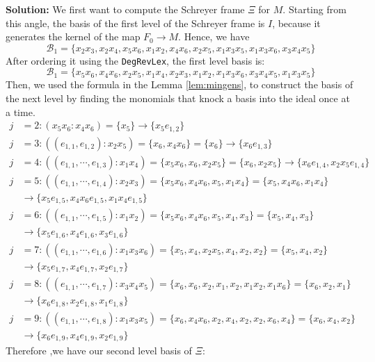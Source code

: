 \documentclass{article}
\theoremstyle{definition}
\theoremstyle{remark}
\theoremstyle{example}
\begin{document}
\textbf{Solution:} We first want to compute the Schreyer frame $\Xi$ for $M$. Starting from this angle, the basis of the first level of the Schreyer frame is $I$, because it generates the kernel of the map $F_0 \rightarrow M$. Hence, we have 
\begin{equation}
    \mathcal{B}_1 = \{x_2x_3,x_2x_4,x_5x_6,x_1x_2,x_4x_6,x_2x_5,x_1x_3x_5,x_1x_3x_6,x_3x_4x_5\}
\end{equation}
After ordering it using the \verb+DegRevLex+, the first level basis is:
\begin{equation}
    \mathcal{B}_1 = \{x_5x_6,x_4x_6,x_2x_5,x_1x_4,x_2x_3,x_1x_2,x_1x_3x_6,x_3x_4x_5,x_1x_3x_5\}
\end{equation}
Then, we used the formula in the Lemma \ref{lem:mingens}, to construct the basis of the next level by finding the monomials that knock a basis into the ideal once at a time.
\begin{align}
    j &= 2: (x_5x_6:x_4x_6) = \{x_5\} \rightarrow \{x_5e_{1,2}\}\\
    j &= 3: ((e_{1,1},e_{1,2}):x_2x_5) = \{x_6,x_4x_6\} = \{x_6\} \rightarrow \{x_6e_{1,3}\}\\
    j &= 4: ((e_{1,1},\cdots,e_{1,3}):x_1x_4) = \{x_5x_6,x_6,x_2x_5\} = \{x_6,x_2x_5\} \rightarrow \{x_6e_{1,4},x_2x_5e_{1,4}\}\\
    j &= 5: ((e_{1,1},\cdots,e_{1,4}):x_2x_3) = \{x_5x_6,x_4x_6,x_5,x_1x_4\} = \{x_5,x_4x_6,x_1x_4\}\\
    &\rightarrow \{x_5e_{1,5},x_4x_6e_{1,5},x_1x_4e_{1,5}\}\\
    j &= 6: ((e_{1,1},\cdots,e_{1,5}):x_1x_2) = \{x_5x_6,x_4x_6,x_5,x_4,x_3\} = \{x_5,x_4,x_3\}\\
    &\rightarrow \{x_5e_{1,6},x_4e_{1,6},x_3e_{1,6}\}\\
    j &= 7: ((e_{1,1},\cdots,e_{1,6}):x_1x_3x_6) = \{x_5,x_4,x_2x_5,x_4,x_2,x_2\} = \{x_5,x_4,x_2\}\\
    &\rightarrow \{x_5e_{1,7},x_4e_{1,7},x_2e_{1,7}\}\\
    j &= 8: ((e_{1,1},\cdots,e_{1,7}):x_3x_4x_5) = \{x_6,x_6,x_2,x_1,x_2,x_1x_2,x_1x_6\} = \{x_6,x_2,x_1\}\\
    &\rightarrow \{x_6e_{1,8},x_2e_{1,8},x_1e_{1,8}\}\\
    j &= 9: ((e_{1,1},\cdots,e_{1,8}):x_1x_3x_5) = \{x_6,x_4x_6,x_2,x_4,x_2,x_2,x_6,x_4\} = \{x_6,x_4,x_2\}\\
    &\rightarrow \{x_6e_{1,9},x_4e_{1,9},x_2e_{1,9}\}
\end{align}
Therefore ,we have our second level basis of $\Xi$:
\end{document}
